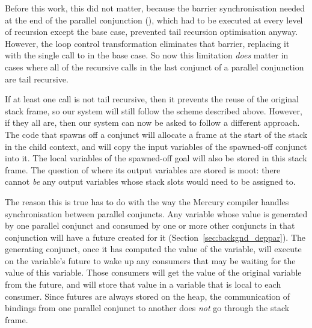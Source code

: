 Before this work, this did not matter, because
the barrier synchronisation needed at the end of the parallel conjunction
(\joinandcontinue),
which had to be executed at every level of recursion except the base case,
prevented tail recursion optimisation anyway.
However, the loop control transformation eliminates that barrier,
replacing it with the single call to \lcfinish in the base case.
So now this limitation \emph{does} matter in cases
where all of the recursive calls in the last conjunct of a parallel conjunction
are tail recursive.

If at least one call is not tail recursive,
then it prevents the reuse of the original stack frame,
so our system will still follow the scheme described above.
However, if they all are,
then our system can now be asked to follow a different approach.
The code that spawns off a conjunct
will allocate a frame at the start of the stack in the child context,
and will copy the input variables of the spawned-off conjunct into it.
The local variables of the spawned-off goal
will also be stored in this stack frame.
The question of where its output variables are stored is moot:
there cannot \emph{be} any output variables
whose stack slots would need to be assigned to.

The reason this is true has to do with the way
the Mercury compiler handles synchronisation between parallel conjuncts.
Any variable whose value is generated by one parallel conjunct
and consumed by one or more other conjuncts in that conjunction
will have a future created for it (Section~\ref{sec:backgnd_deppar}).
The generating conjunct, once it has computed the value of the variable,
will execute \signal on the variable's future
to wake up any consumers that may be waiting for the value of this variable.
Those consumers will get the value of the original variable from the future,
and will store that value in a variable that is local to each consumer.
Since futures are always stored on the heap,
the communication of bindings from one parallel conjunct to another
does \emph{not} go through the stack frame.

